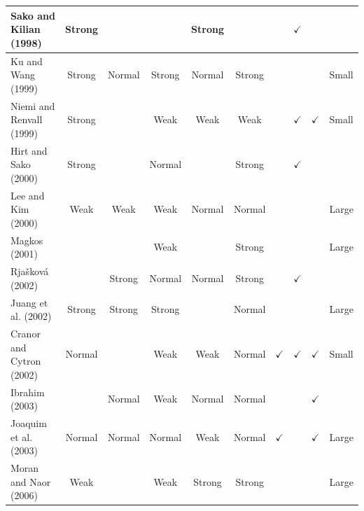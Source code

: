 \documentclass[../access.tex]{subfiles}
\begin{document}
\begin{table}[htbp]
\begin{adjustwidth}{-2cm}{}
\begin{tabular}{m{4.4cm} c c c c c c c c >{\centering\arraybackslash}m{1cm}}
                    \hline
                    \footnotesize{Sako and Kilian (1998) \cite{Sako1998}} & {Strong} & {} & {} & {Strong} & {} & {} & $ \checkmark $ & {} & \\
                    \hline
                    \footnotesize{Ku and Wang (1999) \cite{Ku1999}} & {Strong} & {Normal} & {Strong} & {Normal} & {Strong} & {} & {} & {} & \footnotesize{Small} \\
                    \hline
                    \footnotesize{Niemi and Renvall (1999) \cite{Niemi1999}} & {Strong} & {} & {Weak} & {Weak} & {Weak} & {} & $ \checkmark $ & $ \checkmark $ & \footnotesize{Small} \\
                    \hline
                    \footnotesize{Hirt and Sako (2000) \cite{Hirt2000}} & {Strong} & {} & {Normal} & {} & {Strong} & {} & $ \checkmark $ & {} & \\
                    \hline
                    \footnotesize{Lee and Kim (2000) \cite{Lee2000}} & {Weak} & {Weak} & {Weak} & {Normal} & {Normal} & {} & {} & {} & \footnotesize{Large} \\
                    \hline
                    \footnotesize{Magkos (2001) \cite{Magkos2001}} & {} & {} & {Weak} & {} & {Strong} & {} & {} & {} & \footnotesize{Large} \\
                    \hline
                    \footnotesize{Rja{\v s}kov{\' a} (2002) \cite{Rjaskova2002}} & {} & {Strong} & {Normal} & {Normal} & {Strong} & {} & $ \checkmark $ & {} & \\
                    \hline
                    \footnotesize{Juang et al. (2002) \cite{Juang2002}} & {Strong} & {Strong} & {Strong} & {} & {Normal} & {} & {} & {} & \footnotesize{Large} \\
                    \hline
                    \footnotesize{Cranor and Cytron (2002) \cite{Cranor2002}} & {Normal} & {} & {Weak} & {Weak} & {Normal} & $ \checkmark $ & $ \checkmark $ & $ \checkmark $ & \footnotesize{Small} \\
                    \hline
                    \footnotesize{Ibrahim (2003) \cite{Ibrahim2003}} & {} & {Normal} & {Weak} & {Normal} & {Normal} & {} & {} & $ \checkmark $ & \\
                    \hline
                    \footnotesize{Joaquim et al. (2003) \cite{Joaquim2003}} & {Normal} & {Normal} & {Normal} & {Weak} & {Normal} & $ \checkmark $ & {} & $ \checkmark $ & \footnotesize{Large} \\
                    \hline
                    \footnotesize{Moran and Naor (2006) \cite{Moran2006}} & {Weak} & {} & {Weak} & {Strong} & {Strong} & {} & {} & {} & \footnotesize{Large} \\

\end{tabular}
\end{adjustwidth}
\end{table}
\end{document}
